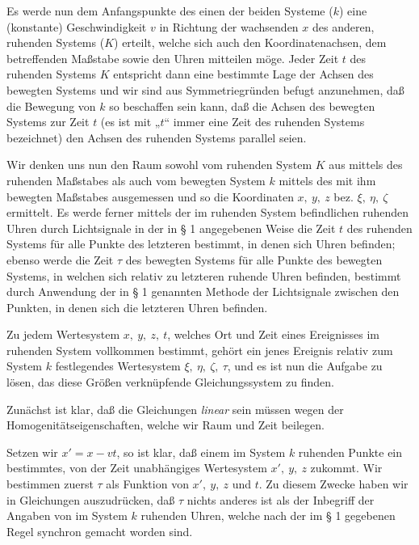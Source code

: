 \documentclass[17pt]{webarticle}       %
\begin{document}
Es werde nun dem Anfangspunkte des einen der beiden Systeme (\( k \)) eine (konstante) Geschwindigkeit \( v \) in Richtung der wachsenden \( x \) des anderen, ruhenden Systems (\( K \)) erteilt, welche sich auch den Koordinatenachsen, dem betreffenden Maßstabe sowie den Uhren mitteilen möge. Jeder Zeit \( t \) des ruhenden Systems \( K \) entspricht dann eine bestimmte Lage der Achsen des bewegten Systems und wir sind aus Symmetriegründen befugt anzunehmen, daß die Bewegung von \( k \) so beschaffen sein kann, daß die Achsen des bewegten Systems zur Zeit \( t \) (es ist mit „\( t \)“ immer eine Zeit des ruhenden Systems bezeichnet) den Achsen des ruhenden Systems parallel seien.

Wir denken uns nun den Raum sowohl vom ruhenden System \( K \) aus mittels des ruhenden Maßstabes als auch vom bewegten System \( k \) mittels des mit ihm bewegten Maßstabes ausgemessen und so die Koordinaten \( x, \ y, \ z \) bez. \( \xi, \ \eta, \ \zeta \) ermittelt. Es werde ferner mittels der im ruhenden System befindlichen ruhenden Uhren durch Lichtsignale in der in § 1 angegebenen Weise die Zeit \( t \) des ruhenden Systems für alle Punkte des letzteren bestimmt, in denen sich Uhren befinden; ebenso werde die Zeit \( \tau \) des bewegten Systems für alle Punkte des bewegten Systems, in welchen sich relativ zu letzteren ruhende Uhren befinden, bestimmt durch Anwendung der in § 1 genannten Methode der Lichtsignale zwischen den Punkten, in denen sich die letzteren Uhren befinden.

Zu jedem Wertesystem \( x, \ y, \ z, \ t \), welches Ort und Zeit eines Ereignisses im ruhenden System vollkommen bestimmt, gehört ein jenes Ereignis relativ zum System \( k \) festlegendes Wertesystem \( \xi, \ \eta, \ \zeta, \ \tau \), und es ist nun die Aufgabe zu lösen, das diese Größen verknüpfende Gleichungssystem zu finden.

Zunächst ist klar, daß die Gleichungen \emph{linear} sein müssen wegen der Homogenitätseigenschaften, welche wir Raum und Zeit beilegen.

Setzen wir \( x' = x - vt \), so ist klar, daß einem im System \( k \) ruhenden Punkte ein bestimmtes, von der Zeit unabhängiges Wertesystem \( x', \ y, \ z \) zukommt. Wir bestimmen zuerst \( \tau \) als Funktion von \( x', \ y, \ z \) und \( t \). Zu diesem Zwecke haben wir in Gleichungen auszudrücken, daß \( \tau \) nichts anderes ist als der Inbegriff der Angaben von im System \( k \) ruhenden Uhren, welche nach der im § 1 gegebenen Regel synchron gemacht worden sind.
\end{document}
